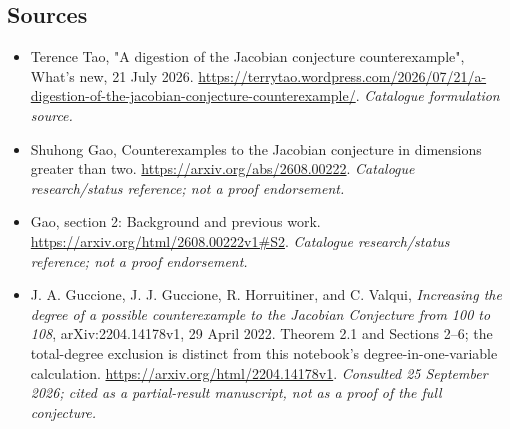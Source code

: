 \documentclass[11pt]{article}
\begin{document}
\subsection{Sources}
\begin{itemize}\raggedright
\item[\textnormal{[S1]}]\hypertarget{source:30006729:1}{} Terence Tao, "A digestion of the Jacobian conjecture counterexample", What's new, 21 July 2026.
\url{https://terrytao.wordpress.com/2026/07/21/a-digestion-of-the-jacobian-conjecture-counterexample/}.
{\small\textit{Catalogue formulation source.}}
\item[\textnormal{[S2]}]\hypertarget{source:30006729:2}{} Shuhong Gao, Counterexamples to the Jacobian conjecture in dimensions greater than two.
\url{https://arxiv.org/abs/2608.00222}.
{\small\textit{Catalogue research/status reference; not a proof endorsement.}}
\item[\textnormal{[S3]}]\hypertarget{source:30006729:3}{} Gao, section 2: Background and previous work.
\url{https://arxiv.org/html/2608.00222v1#S2}.
{\small\textit{Catalogue research/status reference; not a proof endorsement.}}
\item[\textnormal{[E1]}]\hypertarget{extra:30006729:1}{}
J. A. Guccione, J. J. Guccione, R. Horruitiner, and C. Valqui,
\emph{Increasing the degree of a possible counterexample to the Jacobian
Conjecture from 100 to 108}, arXiv:2204.14178v1, 29 April 2022.
Theorem 2.1 and Sections 2--6; the total-degree exclusion is distinct from
this notebook's degree-in-one-variable calculation.
\url{https://arxiv.org/html/2204.14178v1}.
{\small\textit{Consulted 25 September 2026; cited as a partial-result
manuscript, not as a proof of the full conjecture.}}
\end{itemize}
\end{document}
